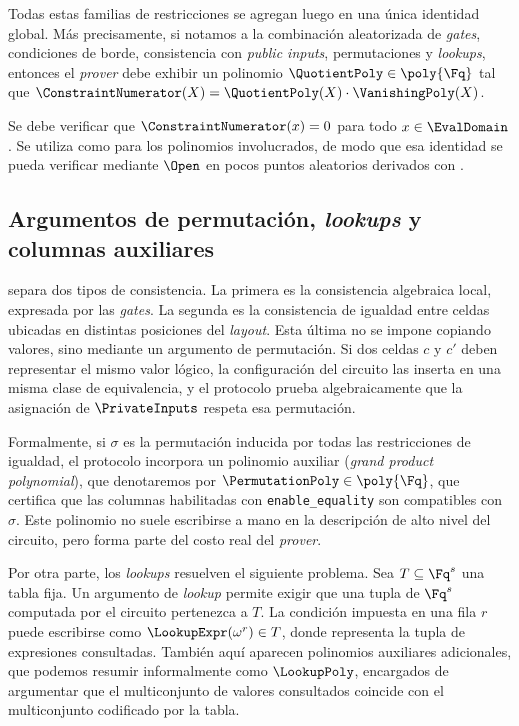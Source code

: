 Todas estas familias de restricciones se agregan luego en una única identidad global. Más precisamente, si notamos \ConstraintNumerator a la combinación aleatorizada de \textit{gates}, condiciones de borde, consistencia con \textit{public inputs}, permutaciones y \textit{lookups}, entonces el \textit{prover} debe exhibir un polinomio $\QuotientPoly \in \poly{\Fq}$ tal que $\ConstraintNumerator(X) = \QuotientPoly(X) \cdot \VanishingPoly(X)$.

Se debe verificar que $\ConstraintNumerator(x) = 0$ para todo $x \in \EvalDomain$. Se utiliza \KZG como \PCS para los polinomios involucrados, de modo que esa identidad se pueda verificar mediante $\Open$ en pocos puntos aleatorios derivados con \FiatShamir.

\subsection{Argumentos de permutación, \textit{lookups} y columnas auxiliares}

\HaloTwo separa dos tipos de consistencia. La primera es la consistencia algebraica local, expresada por las \textit{gates}. La segunda es la consistencia de igualdad entre celdas ubicadas en distintas posiciones del \textit{layout}. Esta última no se impone copiando valores, sino mediante un argumento de permutación. Si dos celdas $c$ y $c'$ deben representar el mismo valor lógico, la configuración del circuito las inserta en una misma clase de equivalencia, y el protocolo prueba algebraicamente que la asignación de $\PrivateInputs$ respeta esa permutación.

Formalmente, si $\sigma$ es la permutación inducida por todas las restricciones de igualdad, el protocolo incorpora un polinomio auxiliar (\textit{grand product polynomial}), que denotaremos por $\PermutationPoly \in \poly{\Fq}$, que certifica que las columnas habilitadas con \texttt{enable\_equality} son compatibles con $\sigma$. Este polinomio no suele escribirse a mano en la descripción de alto nivel del circuito, pero forma parte del costo real del \textit{prover}.

Por otra parte, los \textit{lookups} resuelven el siguiente problema. Sea $T \subseteq \Fq^s$ una tabla fija. Un argumento de \textit{lookup} permite exigir que una tupla de $\Fq^s$ computada por el circuito pertenezca a $T$. La condición impuesta en una fila $r$ puede escribirse como $\LookupExpr(\omega^r) \in T$, donde \LookupExpr representa la tupla de expresiones consultadas. También aquí aparecen polinomios auxiliares adicionales, que podemos resumir informalmente como $\LookupPoly$, encargados de argumentar que el multiconjunto de valores consultados coincide con el multiconjunto codificado por la tabla.

